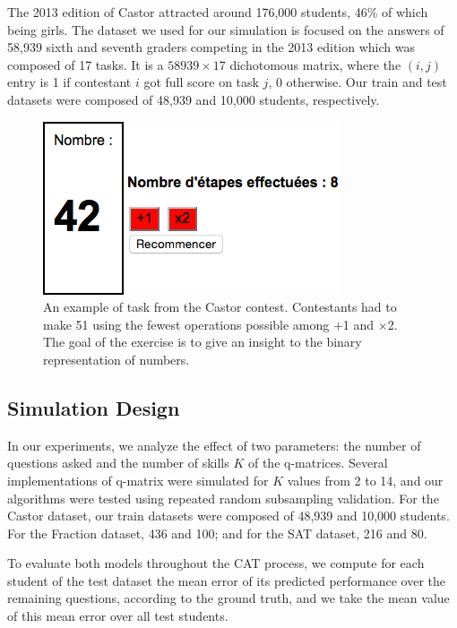 \documentclass{edm_template}
\begin{document}
The 2013 edition of Castor attracted around 176,000 students, 46\% of which being girls. The dataset we used for our simulation is focused on the answers of 58,939 sixth and seventh graders competing in the 2013 edition which was composed of 17 tasks. It is a $58939 \times 17$ dichotomous matrix, where the $(i, j)$ entry is 1 if contestant $i$ got full score on task $j$, 0 otherwise. Our train and test datasets were composed of 48,939 and 10,000 students, respectively.

\begin{figure}
\includegraphics[width=\linewidth]{51-calc}
\caption{An example of task from the Castor contest. Contestants had to make 51 using the fewest operations possible among $+$1 and $\times$2. The goal of the exercise is to give an insight to the binary representation of numbers.}
\label{fig:51}
\end{figure}

\subsection{Simulation Design}

In our experiments, we analyze the effect of two parameters: the number of questions asked and the number of skills $K$ of the q-matrices. Several implementations of q-matrix were simulated for $K$ values from 2 to 14, and our algorithms were tested using repeated random subsampling validation. For the Castor dataset, our train datasets were composed of 48,939 and 10,000 students. For the Fraction dataset, 436 and 100; and for the SAT dataset, 216 and 80. 

To evaluate both models throughout the CAT process, we compute for each student of the test dataset the mean error of its predicted performance over the remaining questions, according to the ground truth, and we take the mean value of this mean error over all test students.
\end{document}
